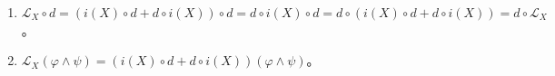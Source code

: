 \begin{itemize}
\begin{enumerate}
        \begin{align*}
            [(i(X) \circ d)(\omega)](Y_1,\dots Y_r)
             = &[i(X)(d\omega)](Y_1,\dots Y_r)\\
             = &d\omega(X,Y_1,\cdots Y_r)\\
             = &X(\omega(Y_1,\cdots,Y_r)) + \sum\limits_{\lambda = 1}^{r}(-1)^r Y_{\lambda}(\omega(X,Y_1,\cdots,\hat{Y_{\lambda}},\cdots,Y_r))\\
             &+ \sum_{\lambda < \mu} (-1)^{\lambda + \mu + 1} \omega (X,[Y_{\lambda},Y_{\mu}],Y_1,\dots,\hat{Y_{\lambda}},\cdots,\hat{Y_{\mu}},\cdots，Y_r)\\
             &+ \sum_{\lambda = 1}^{\lambda = r}(-1)^{\lambda} \omega([X,Y_{\lambda}],Y_1,\cdots,\hat{Y_{\lambda}},\dots,Y_r).
        \end{align*}

        记$i(X)(\omega) = \phi \in A^{r-1}(M)$，

        \begin{align*}
            [(d \circ i(X))(\omega)](Y_1,\dots Y_r) 
            =& d\phi(Y_1,\dots Y_r)\\
            =& \sum\limits_{\lambda = 1}^{r}(-1)^{r+1}Y_{\lambda}(\phi(Y_1,\dots,\hat{Y_{\lambda}},\dots,Y_r)) + \sum_{\lambda < \mu} (-1)^{\lambda + \mu} \phi ([Y_{\lambda},Y_{\mu}],Y_1,\dots,\hat{Y_{\lambda}},\cdots,\hat{Y_{\mu}},\dots，Y_r)\\
            =& \sum\limits_{\lambda = 1}^{r}(-1)^{r+1}Y_{\lambda}(\omega(X,Y_1,\dots,\hat{Y_{\lambda}},\dots,Y_r)) + \sum_{\lambda < \mu} (-1)^{\lambda + \mu} \omega (X,[Y_{\lambda},Y_{\mu}],Y_1,\dots,\hat{Y_{\lambda}},\cdots,\hat{Y_{\mu}},\cdots，Y_r)
        \end{align*}

        $$[(i(X) \circ d + d \circ i(X))(\omega)](Y_1,\cdots Y_r)= X(\omega(Y_1,\cdots,Y_r)) + \sum\limits_{\lambda = 1}^{r}(-1)^{\lambda} \omega([X,Y_{\lambda}],Y_1,\cdots,\hat{Y_{\lambda}},\cdots,Y_r)$$
        
        $$(\mathscr{L}_X(\omega))= \lim\limits_{t \to 0} \frac{(\Phi_{t})^*(\omega)-\omega}{t}.$$

        仿照定理3.5（P146）即可证明。

        \item[(2)]
        $\mathscr{L}_X \circ d = (i(X) \circ d + d \circ i(X))\circ d = d\circ i(X) \circ d = d \circ (i(X) \circ d + d \circ i(X)) = d \circ \mathscr{L}_X$。

        \item[(3)]
        $\mathscr{L}_X(\varphi \wedge \psi) = (i(X) \circ d + d \circ i(X))(\varphi \wedge \psi)$。


\end{enumerate}
\end{itemize}
